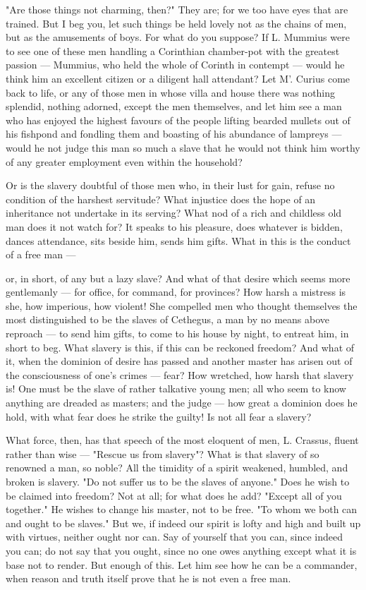 "Are those things not charming, then?" They are; for we too have eyes that are trained. But I beg you, let such things be held lovely not as the chains of men, but as the amusements of boys. For what do you suppose? If L. Mummius were to see one of these men handling a Corinthian chamber-pot with the greatest passion — Mummius, who held the whole of Corinth in contempt — would he think him an excellent citizen or a diligent hall attendant? Let M'. Curius come back to life, or any of those men in whose villa and house there was nothing splendid, nothing adorned, except the men themselves, and let him see a man who has enjoyed the highest favours of the people lifting bearded mullets out of his fishpond and fondling them and boasting of his abundance of lampreys — would he not judge this man so much a slave that he would not think him worthy of any greater employment even within the household?

 Or is the slavery doubtful of those men who, in their lust for gain, refuse no condition of the harshest servitude? What injustice does the hope of an inheritance not undertake in its serving? What nod of a rich and childless old man does it not watch for? It speaks to his pleasure, does whatever is bidden, dances attendance, sits beside him, sends him gifts. What in this is the conduct of a free man —

 or, in short, of any but a lazy slave? And what of that desire which seems more gentlemanly — for office, for command, for provinces? How harsh a mistress is she, how imperious, how violent! She compelled men who thought themselves the most distinguished to be the slaves of Cethegus, a man by no means above reproach — to send him gifts, to come to his house by night, to entreat him, in short to beg. What slavery is this, if this can be reckoned freedom? And what of it, when the dominion of desire has passed and another master has arisen out of the consciousness of one's crimes — fear? How wretched, how harsh that slavery is! One must be the slave of rather talkative young men; all who seem to know anything are dreaded as masters; and the judge — how great a dominion does he hold, with what fear does he strike the guilty! Is not all fear a slavery?

 What force, then, has that speech of the most eloquent of men, L. Crassus, fluent rather than wise — "Rescue us from slavery"? What is that slavery of so renowned a man, so noble? All the timidity of a spirit weakened, humbled, and broken is slavery. "Do not suffer us to be the slaves of anyone." Does he wish to be claimed into freedom? Not at all; for what does he add? "Except all of you together." He wishes to change his master, not to be free. "To whom we both can and ought to be slaves." But we, if indeed our spirit is lofty and high and built up with virtues, neither ought nor can. Say of yourself that you can, since indeed you can; do not say that you ought, since no one owes anything except what it is base not to render. But enough of this. Let him see how he can be a commander, when reason and truth itself prove that he is not even a free man.

